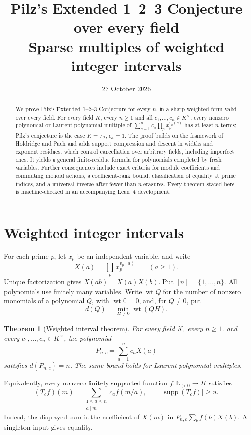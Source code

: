 \documentclass[11pt]{article}
\title{Pilz's Extended 1--2--3 Conjecture over every field\\[3pt]
\large Sparse multiples of weighted integer intervals}
\author{}
\date{23 October 2026}
\DeclareMathOperator{\wt}{wt}\DeclareMathOperator{\ord}{ord}
\DeclareMathOperator{\supp}{supp}\DeclareMathOperator{\rank}{rank}
\numberwithin{equation}{section}
\newtheorem{theorem}{Theorem}[section]
\theoremstyle{definition}\newtheorem{definition}[theorem]{Definition}
\theoremstyle{remark}\newtheorem{remark}[theorem]{Remark}
\begin{document}
\maketitle
\begin{abstract}
We prove Pilz's Extended 1--2--3 Conjecture for every $n$, in a sharp
weighted form valid over every field. For every field $K$, every $n\ge1$
and all $c_1,\ldots,c_n\in K^\times$, every nonzero polynomial or
Laurent-polynomial multiple of $\sum_{a=1}^n c_a\prod_p x_p^{v_p(a)}$
has at least $n$ terms; Pilz's conjecture is the case $K=\mathbb F_2$,
$c_a=1$. The proof builds on the framework of Holdridge and Pach and adds
support compression and descent in widths and exponent residues, which
control cancellation over arbitrary fields, including imperfect ones.
It yields a general finite-residue formula for polynomials completed by
fresh variables. Further consequences include exact criteria for module
coefficients and commuting monoid actions, a coefficient-rank bound,
classification of equality at prime indices, and a universal inverse
after fewer than $n$ erasures. Every theorem stated here is
machine-checked in an accompanying Lean~4 development.
\end{abstract}

\begingroup
\small
\makeatletter
\renewcommand{\l@section}{\@dottedtocline{1}{0em}{1.8em}}
\makeatother
\tableofcontents
\endgroup

\section{Weighted integer intervals}\label{sec:main}

For each prime $p$, let $x_p$ be an independent variable, and write
\[
 X(a)=\prod_p x_p^{v_p(a)}\qquad(a\ge1).
\]
Unique factorization gives $X(ab)=X(a)X(b)$. Put $[n]=\{1,\ldots,n\}$.
All polynomials use finitely many variables. Write $\wt Q$ for
the number of nonzero monomials of a polynomial $Q$, with $\wt0=0$,
and, for $Q\ne0$, put
\[
 d(Q)=\min_{H\ne0}\wt(QH).
\]

\begin{theorem}[Weighted interval theorem]\label{thm:field}
For every field $K$, every $n\ge1$, and every
$c_1,\ldots,c_n\in K^\times$, the polynomial
\[
 P_{n,c}=\sum_{a=1}^n c_aX(a)
\]
satisfies $d(P_{n,c})=n$. The same bound holds for Laurent
polynomial multiples.
\end{theorem}

Equivalently, every nonzero finitely supported function
$f:\mathbb N_{>0}\to K$ satisfies
\begin{equation}\label{eq:convolution}
 (T_cf)(m)=\sum_{\substack{1\le a\le n\\a\mid m}}c_af(m/a),
 \qquad |\supp(T_cf)|\ge n.
\end{equation}
Indeed, the displayed sum is the coefficient of $X(m)$ in
$P_{n,c}\sum_b f(b)X(b)$. A singleton input gives equality.
\end{document}
